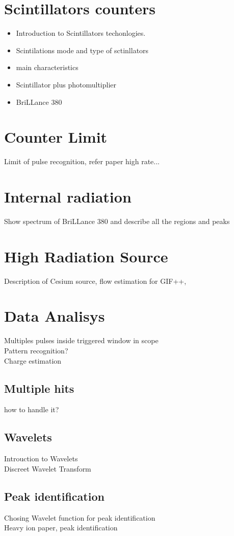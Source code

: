 \section{Scintillators counters}
\begin{itemize}
\item Introduction to Scintillators techonlogies.
\item Scintilations mode and type of sctinllators
\item main characteristics
\item Scintillator plus photomultiplier
\item BriLLance 380
\end{itemize}
\section{Counter Limit}
Limit of pulse recognition, refer paper high rate...
\section{Internal radiation}
Show spectrum of BriLLance 380 and describe all the regions and peaks
\section{High Radiation Source}
Description of Cesium source, flow estimation for GIF++, 
\section{Data Analisys}
Multiples pulses inside triggered window in scope\\
Pattern recognition?\\
Charge estimation\\
\subsection{Multiple hits}
how to handle it?\\
\subsection{Wavelets}
Introuction to Wavelets\\
Discreet Wavelet Transform\\

\subsection{Peak identification}
Chosing Wavelet function for peak identification\\
Heavy ion paper, peak identification\\
